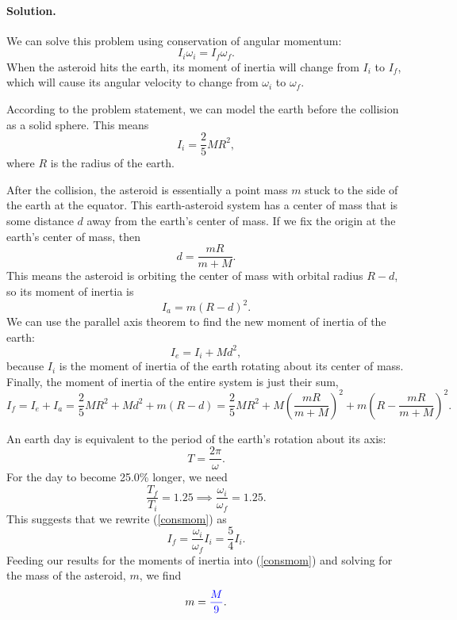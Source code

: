 \documentclass[11pt]{article}
\newcommand{\refeq}[1]{(\ref{#1})}
\newcommand{\beq}{\begin{equation*}}
\newcommand{\eeq}{\end{equation*}}
\newcommand{\beqn}{\begin{equation}}
\newcommand{\eeqn}{\end{equation}}
\newenvironment{solution}
{
    \paragraph{Solution.}
    \ignorespaces
}
{
    \bigskip
}
\begin{document}
\begin{solution}
	We can solve this problem using conservation of angular momentum:
	\beqn \label{consmom}
		I_i \omega_i = I_f \omega_f.
	\eeqn
	When the asteroid hits the earth, its moment of inertia will change from $I_i$ to $I_f$, which will cause its angular velocity to change from $\omega_i$ to $\omega_f$.
	
	According to the problem statement, we can model the earth before the collision as a solid sphere.  This means
	\beq
		I_i = \frac{2}{5} M R^2,
	\eeq
	where $R$ is the radius of the earth.
	
	After the collision, the asteroid is essentially a point mass $m$ stuck to the side of the earth at the equator.  This earth-asteroid system has a center of mass that is some distance $d$ away from the earth's center of mass.  If we fix the origin at the earth's center of mass, then
	\beq
		d = \frac{m R}{m + M}.
	\eeq
	This means the asteroid is orbiting the center of mass with orbital radius $R - d$, so its moment of inertia is
	\beq
		I_a = m (R - d)^2.
	\eeq
	We can use the parallel axis theorem to find the new moment of inertia of the earth:
	\beq
		I_e = I_i + M d^2,
	\eeq
	because $I_i$ is the moment of inertia of the earth rotating about its center of mass.  Finally, the moment of inertia of the entire system is just their sum,
	\beq
		I_f = I_e + I_a = \frac{2}{5} M R^2 + M d^2 + m (R - d) = \frac{2}{5} M R^2 + M \left( \frac{m R}{m + M} \right)^2 + m \left( R - \frac{m R}{m + M} \right)^2.
	\eeq
	
	An earth day is equivalent to the period of the earth's rotation about its axis:
	\beq
		T = \frac{2 \pi}{\omega}.
	\eeq
	For the day to become 25.0\% longer, we need
	\beq
		\frac{T_f}{T_i} = 1.25 \implies \frac{\omega_i}{\omega_f} = 1.25.
	\eeq
	This suggests that we rewrite \refeq{consmom} as
	\beq
		I_f = \frac{\omega_i}{\omega_f} I_i = \frac{5}{4} I_i.
	\eeq
	Feeding our results for the moments of inertia into \refeq{consmom} and solving for the mass of the asteroid, $m$, we find
	\beq
		m = {\color{blue} \frac{M}{9}}.
	\eeq
\end{solution}
\end{document}

